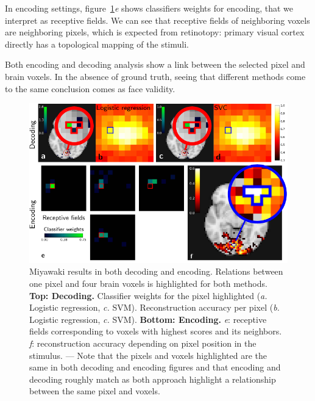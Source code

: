 \documentclass{frontiersSCNS} %
\begin{document}
In encoding settings, figure~\ref{fig:miyawaki}\textit{e} shows classifiers
weights for encoding, that we interpret as receptive fields. We can
see that receptive fields of neighboring voxels are neighboring
pixels, which is expected from retinotopy: primary visual
cortex directly has a topological mapping of the stimuli.

Both encoding and decoding analysis show a link between the selected
pixel and brain voxels. In the absence of ground truth, seeing that
different methods come to the same conclusion comes as face validity.


\begin{figure}[hbtp]
  \begin{center}
    \includegraphics[width=\linewidth]{scripts/miyawaki/figure}
  \end{center}
  \caption{
      Miyawaki results in both decoding and encoding. Relations between one
      pixel and four brain voxels is highlighted for both methods.
      \textbf{Top: Decoding.} Classifier weights for the pixel
      highlighted (\textit{a.} Logistic regression, \textit{c.} SVM).
      Reconstruction accuracy per pixel
      (\textit{b.} Logistic
      regression, \textit{c.} SVM). 
      \textbf{Bottom: Encoding.} \textit{e}: receptive fields corresponding to
       voxels with highest scores and its neighbors.
       \textit{f}: reconstruction accuracy depending on 
	  pixel position in the stimulus. --- Note that the pixels and voxels highlighted are the same in 
      both decoding and encoding figures and that encoding and decoding
      roughly match as both approach highlight a relationship between the
      same pixel and voxels.
}
\label{fig:miyawaki}
\end{figure}
\end{document}
